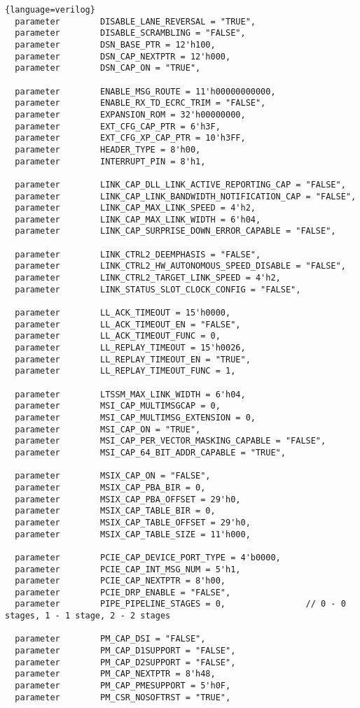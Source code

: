 \begin{lstlisting}{language=verilog}
  parameter        DISABLE_LANE_REVERSAL = "TRUE",
  parameter        DISABLE_SCRAMBLING = "FALSE",
  parameter        DSN_BASE_PTR = 12'h100,
  parameter        DSN_CAP_NEXTPTR = 12'h000,
  parameter        DSN_CAP_ON = "TRUE",

  parameter        ENABLE_MSG_ROUTE = 11'h00000000000,
  parameter        ENABLE_RX_TD_ECRC_TRIM = "FALSE",
  parameter        EXPANSION_ROM = 32'h00000000,
  parameter        EXT_CFG_CAP_PTR = 6'h3F,
  parameter        EXT_CFG_XP_CAP_PTR = 10'h3FF,
  parameter        HEADER_TYPE = 8'h00,
  parameter        INTERRUPT_PIN = 8'h1,

  parameter        LINK_CAP_DLL_LINK_ACTIVE_REPORTING_CAP = "FALSE",
  parameter        LINK_CAP_LINK_BANDWIDTH_NOTIFICATION_CAP = "FALSE",
  parameter        LINK_CAP_MAX_LINK_SPEED = 4'h2,
  parameter        LINK_CAP_MAX_LINK_WIDTH = 6'h04,
  parameter        LINK_CAP_SURPRISE_DOWN_ERROR_CAPABLE = "FALSE",

  parameter        LINK_CTRL2_DEEMPHASIS = "FALSE",
  parameter        LINK_CTRL2_HW_AUTONOMOUS_SPEED_DISABLE = "FALSE",
  parameter        LINK_CTRL2_TARGET_LINK_SPEED = 4'h2,
  parameter        LINK_STATUS_SLOT_CLOCK_CONFIG = "FALSE",

  parameter        LL_ACK_TIMEOUT = 15'h0000,
  parameter        LL_ACK_TIMEOUT_EN = "FALSE",
  parameter        LL_ACK_TIMEOUT_FUNC = 0,
  parameter        LL_REPLAY_TIMEOUT = 15'h0026,
  parameter        LL_REPLAY_TIMEOUT_EN = "TRUE",
  parameter        LL_REPLAY_TIMEOUT_FUNC = 1,

  parameter        LTSSM_MAX_LINK_WIDTH = 6'h04,
  parameter        MSI_CAP_MULTIMSGCAP = 0,
  parameter        MSI_CAP_MULTIMSG_EXTENSION = 0,
  parameter        MSI_CAP_ON = "TRUE",
  parameter        MSI_CAP_PER_VECTOR_MASKING_CAPABLE = "FALSE",
  parameter        MSI_CAP_64_BIT_ADDR_CAPABLE = "TRUE",

  parameter        MSIX_CAP_ON = "FALSE",
  parameter        MSIX_CAP_PBA_BIR = 0,
  parameter        MSIX_CAP_PBA_OFFSET = 29'h0,
  parameter        MSIX_CAP_TABLE_BIR = 0,
  parameter        MSIX_CAP_TABLE_OFFSET = 29'h0,
  parameter        MSIX_CAP_TABLE_SIZE = 11'h000,

  parameter        PCIE_CAP_DEVICE_PORT_TYPE = 4'b0000,
  parameter        PCIE_CAP_INT_MSG_NUM = 5'h1,
  parameter        PCIE_CAP_NEXTPTR = 8'h00,
  parameter        PCIE_DRP_ENABLE = "FALSE",
  parameter        PIPE_PIPELINE_STAGES = 0,                // 0 - 0 stages, 1 - 1 stage, 2 - 2 stages

  parameter        PM_CAP_DSI = "FALSE",
  parameter        PM_CAP_D1SUPPORT = "FALSE",
  parameter        PM_CAP_D2SUPPORT = "FALSE",
  parameter        PM_CAP_NEXTPTR = 8'h48,
  parameter        PM_CAP_PMESUPPORT = 5'h0F,
  parameter        PM_CSR_NOSOFTRST = "TRUE",


\end{lstlisting}
